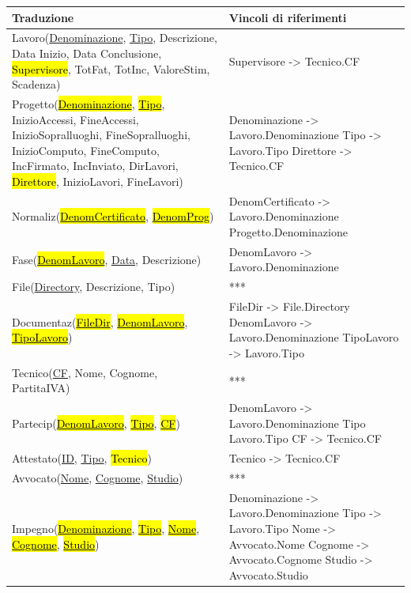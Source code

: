 \documentclass{elegantbook}
\begin{document}
		\begin{longtable}{|p{9cm}|p{8cm}|}
		\hline
		\textbf{Traduzione} & \textbf{Vincoli di riferimenti} \\
		\hline
		Lavoro(\underline{Denominazione}, \underline{Tipo}, Descrizione, Data Inizio, Data Conclusione, \hl{Supervisore},  TotFat, TotInc, ValoreStim, Scadenza) & Supervisore  -> Tecnico.CF \\
		\hline
		Progetto(\underline{\hl{Denominazione}}, \underline{\hl{Tipo}}, InizioAccessi, FineAccessi, InizioSopralluoghi, FineSopralluoghi, InizioComputo, FineComputo, IncFirmato, IncInviato, DirLavori, \hl{Direttore}, InizioLavori, FineLavori) & Denominazione -> Lavoro.Denominazione \newline Tipo -> Lavoro.Tipo \newline Direttore -> Tecnico.CF\\
		\hline
		Normaliz(\underline{\hl{DenomCertificato}}, \underline{\hl{DenomProg}}) & DenomCertificato -> Lavoro.Denominazione \newline Progetto.Denominazione \\
		\hline
		Fase(\underline{\hl{DenomLavoro}}, \underline{Data}, Descrizione) & DenomLavoro -> Lavoro.Denominazione\\
		\hline
		File(\underline{Directory}, Descrizione, Tipo) & ***\\
		\hline
		Documentaz(\underline{\hl{FileDir}}, \underline{\hl{DenomLavoro}}, \underline{\hl{TipoLavoro}}) & FileDir -> File.Directory \newline DenomLavoro -> Lavoro.Denominazione \newline TipoLavoro -> Lavoro.Tipo\\
		\hline
		Tecnico(\underline{CF}, Nome, Cognome, PartitaIVA) & ***\\
		\hline 
		Partecip(\underline{\hl{DenomLavoro}}, \underline{\hl{Tipo}}, \underline{\hl{CF}}) & DenomLavoro -> Lavoro.Denominazione \newline Tipo Lavoro.Tipo \newline CF -> Tecnico.CF\\
		\hline
		Attestato(\underline{ID}, \underline{Tipo}, \hl{Tecnico}) & Tecnico -> Tecnico.CF\\
		\hline
		Avvocato(\underline{Nome}, \underline{Cognome}, \underline{Studio}) & ***\\
		\hline
		Impegno(\underline{\hl{Denominazione}}, \underline{\hl{Tipo}}, \underline{\hl{Nome}}, \underline{\hl{Cognome}}, \underline{\hl{Studio}}) & Denominazione -> Lavoro.Denominazione \newline Tipo -> Lavoro.Tipo \newline Nome -> Avvocato.Nome \newline Cognome -> Avvocato.Cognome \newline Studio -> Avvocato.Studio\\

\end{longtable}
\end{document}
